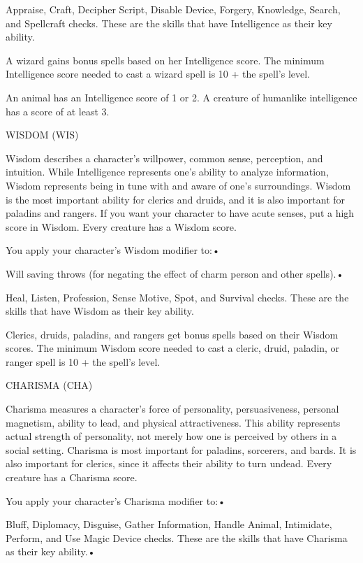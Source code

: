 \parindent=7pt
Appraise, Craft, Decipher Script, Disable Device, Forgery, Knowledge, Search, and 
Spellcraft checks. These are the skills that have Intelligence as their key ability.

\parindent=0pt
A wizard gains bonus spells based on her Intelligence score. The minimum Intelligence 
score needed to cast a wizard spell is 10 + the spell's level. 

An animal has an Intelligence score of 1 or 2. A creature of humanlike intelligence 
has a score of at least 3.

\vspace{12pt}
WISDOM (WIS)

Wisdom describes a character's willpower, common sense, perception, and intuition. 
While Intelligence represents one's ability to analyze information, Wisdom represents 
being in tune with and aware of one's surroundings. Wisdom is the most important 
ability for clerics and druids, and it is also important for paladins and rangers. 
If you want your character to have acute senses, put a high score in Wisdom. Every 
creature has a Wisdom score.

You apply your character's Wisdom modifier to:• 

\parindent=3pt
Will saving throws (for negating the effect of charm person and other spells).• 

Heal, Listen, Profession, Sense Motive, Spot, and Survival checks. These are the 
skills that have Wisdom as their key ability.

Clerics, druids, paladins, and rangers get bonus spells based on their Wisdom scores. 
The minimum Wisdom score needed to cast a cleric, druid, paladin, or ranger spell 
is 10 + the spell's level.

\vspace{12pt}
\parindent=0pt
CHARISMA (CHA)

Charisma measures a character's force of personality, persuasiveness, personal 
magnetism, ability to lead, and physical attractiveness. This ability represents 
actual strength of personality, not merely how one is perceived by others in a 
social setting. Charisma is most important for paladins, sorcerers, and bards. 
It is also important for clerics, since it affects their ability to turn undead. 
Every creature has a Charisma score.

You apply your character's Charisma modifier to:• 

\parindent=3pt
Bluff, Diplomacy, Disguise, Gather Information, Handle Animal, Intimidate, Perform, 
and Use Magic Device checks. These are the skills that have Charisma as their key 
ability.• 

